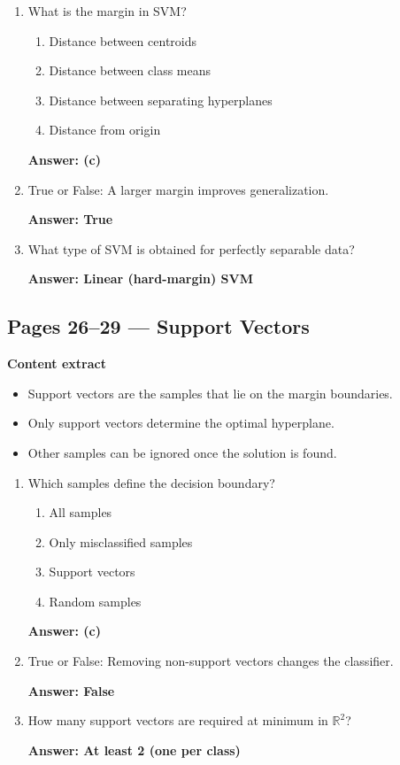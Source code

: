 \documentclass[12pt]{article}
\begin{document}
\begin{enumerate}
	\item What is the margin in SVM?
	\begin{enumerate}
		\item Distance between centroids
		\item Distance between class means
		\item Distance between separating hyperplanes
		\item Distance from origin
	\end{enumerate}
	\textbf{Answer: (c)}
	
	\item True or False: A larger margin improves generalization.
	
	\textbf{Answer: True}
	
	\item What type of SVM is obtained for perfectly separable data?
	
	\textbf{Answer: Linear (hard-margin) SVM}
\end{enumerate}


\subsection*{Pages 26--29 — Support Vectors}

\textbf{Content extract}
\begin{itemize}
	\item Support vectors are the samples that lie on the margin boundaries.
	\item Only support vectors determine the optimal hyperplane.
	\item Other samples can be ignored once the solution is found.
\end{itemize}

\begin{enumerate}
	\item Which samples define the decision boundary?
	\begin{enumerate}
		\item All samples
		\item Only misclassified samples
		\item Support vectors
		\item Random samples
	\end{enumerate}
	\textbf{Answer: (c)}
	
	\item True or False: Removing non-support vectors changes the classifier.
	
	\textbf{Answer: False}
	
	\item How many support vectors are required at minimum in $\mathbb{R}^2$?
	
	\textbf{Answer: At least 2 (one per class)}
\end{enumerate}
\end{document}
